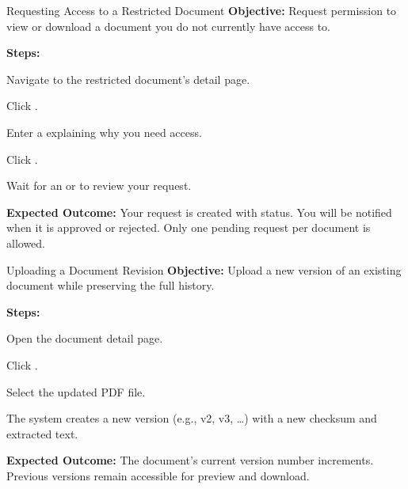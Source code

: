 \vspace{8pt}

\begin{ugTask}{Requesting Access to a Restricted Document}
  \textbf{Objective:} Request permission to view or download a
  document you do not currently have access to.

  \textbf{Steps:}
  \begin{ugSteps}
    \item Navigate to the restricted document's detail page.
    \item Click .
    \item Enter a  explaining why you need
          access.
    \item Click .
    \item Wait for an  or  to
          review your request.
  \end{ugSteps}

  \textbf{Expected Outcome:} Your request is created with
   status. You will be notified
  when it is approved or rejected. Only one pending request
  per document is allowed.
\end{ugTask}

\vspace{8pt}

\begin{ugTask}{Uploading a Document Revision}
  \textbf{Objective:} Upload a new version of an existing
  document while preserving the full history.

  \textbf{Steps:}
  \begin{ugSteps}
    \item Open the document detail page.
    \item Click .
    \item Select the updated PDF file.
    \item The system creates a new version (e.g., v2, v3, \ldots)
          with a new checksum and extracted text.
  \end{ugSteps}

  \textbf{Expected Outcome:} The document's current version
  number increments. Previous versions remain accessible for
  preview and download.
\end{ugTask}

